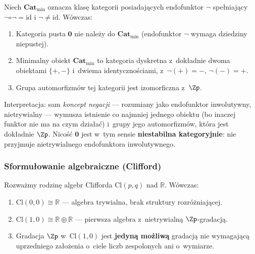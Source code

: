 \begin{proposition}%
\label{prop:0-endofunktor}
Niech $\mathbf{Cat}_{\min}$ oznacza klas\k{e} kategorii posiadaj\k{a}cych
endofunktor $\neg$ spe\l{}niaj\k{a}cy $\neg\circ\neg = \mathrm{id}$ i
$\neg \neq \mathrm{id}$. W\'owczas:
\begin{enumerate}[label=(\roman*), nosep]
  \item Kategoria pusta $\mathbf{0}$ nie nale\.zy do $\mathbf{Cat}_{\min}$
    (endofunktor $\neg$ wymaga dziedziny niepustej).
  \item Minimalny obiekt $\mathbf{Cat}_{\min}$ to kategoria dyskretna
    z~dok\l{}adnie dwoma obiektami $\{+, -\}$ i~dwiema identyczno\'sciami,
    z~$\neg(+) = -$, $\neg(-) = +$.
  \item Grupa automorfizm\'ow tej kategorii jest izomorficzna z~$\Zp$.
\end{enumerate}
\end{proposition}

Interpretacja: sam \emph{koncept negacji} --- rozumiany jako
endofunktor inwolutywny, nietrywialny --- wymusza istnienie co
najmniej jednego obiektu (bo inaczej funktor nie ma na czym
dzia\l{}a\'c) i~grupy jego automorfizm\'ow, kt\'ora jest dok\l{}adnie
$\Zp$. Nicość $\mathbf{0}$ jest w~tym sensie \textbf{niestabilna
kategoryjnie}: nie przyjmuje nietrywialnego endofunktora
inwolutywnego.

\subsubsection{Sformu\l{}owanie algebraiczne (Clifford)}%
\label{app:0-clifford}

\begin{proposition}\label{prop:0-clifford}
Rozwa\.zmy rodzin\k{e} algebr Clifforda $\mathrm{Cl}(p,q)$ nad
$\mathbb{R}$. W\'owczas:
\begin{enumerate}[label=(\roman*), nosep]
  \item $\mathrm{Cl}(0,0) \cong \mathbb{R}$ --- algebra trywialna,
    brak struktury rozr\'o\.zniaj\k{a}cej.
  \item $\mathrm{Cl}(1,0) \cong \mathbb{R} \oplus \mathbb{R}$
    --- pierwsza algebra z~nietrywialn\k{a} $\Zp$-gradacj\k{a}.
  \item Gradacja $\Zp$ w~$\mathrm{Cl}(1,0)$ jest \textbf{jedyn\k{a}
    mo\.zliw\k{a}} gradacj\k{a} nie wymagaj\k{a}c\k{a} uprzedniego
    za\l{}o\.zenia o~ciele liczb zespolonych ani o~wymiarze.
\end{enumerate}
\end{proposition}

